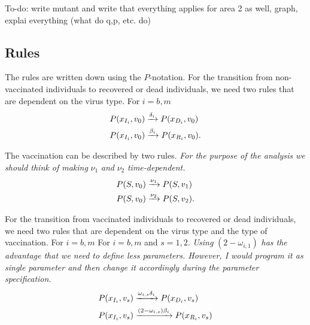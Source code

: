 To-do: write mutant and write that everything applies for area 2 as well, graph, explai everything (what do q,p, etc. do)



\subsection{Rules}
The rules are written down using the $P$-notation. For the transition from non-vaccinated individuals to recovered or dead individuals, we need two rules that are dependent on the virus type. For $i = b,m$
\begin{align}
    P(x_{I_i},  v_0) &\xrightarrow{\delta_i} P(x_{D_i}, v_0) \\
    P(x_{I_i},  v_0) &\xrightarrow{\beta_i} P(x_{R_i},  v_0).\notag
\end{align}

The vaccination can be described by two rules. \textit{For the purpose of the analysis we should think of making} $\nu_1$ \textit{and} $\nu_2$ \textit{time-dependent.}
\begin{align}
    P(S, v_0) &\xrightarrow{\nu_1} P(S, v_1) \\
    P(S, v_0) &\xrightarrow{\nu_2} P(S, v_2).\notag
\end{align}

For the transition from vaccinated individuals to recovered or dead individuals, we need two rules that are dependent on the virus type and the type of vaccination. For $i = b,m$ For $i = b,m$ and $s = 1,2$. \textit{Using} $(2-\omega_{i,1})$ \textit{has the advantage that we need to define less parameters. However, I would program it as single parameter and then change it accordingly during the parameter specification.}
\begin{align}
    P(x_{I_i},  v_s) &\xrightarrow{\omega_{i,s} \delta_i} P(x_{D_i}, v_s) \\
    P(x_{I_i}, v_s) &\xrightarrow{(2-\omega_{i,s})\beta_i} P(x_{R_i}, v_s)\notag
\end{align}

